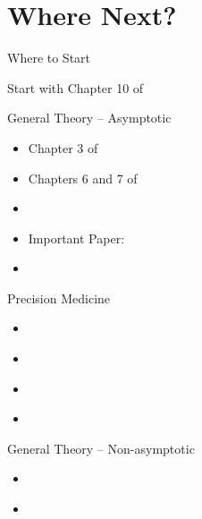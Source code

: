 \documentclass[aspectratio=169, professionalfonts]{beamer}
\begin{document}
\section{Where Next?}

\begin{frame}{Where to Start}
	\vfill

	Start with Chapter 10 of \cite{tsiatis2019Dynamic}
	\vfill

\end{frame}

\begin{frame}{General Theory -- Asymptotic}
	\vfill
	\begin{itemize}
		\item Chapter 3 of \cite{tsiatis2006Semiparametric}
		      \vfill
		\item Chapters 6 and 7 of \cite{vandervaart2000Asymptotic}
		      \vfill
		\item \cite{kosorok2008Introduction}
		      \vfill
		\item Important Paper: \cite{hirano2012Impossibility}
		      \vfill


		\item 	\cite{bibaut2021PostContextualBandit}
		      \vfill
	\end{itemize}
\end{frame}

\begin{frame}{Precision Medicine}
	\vfill
	\begin{itemize}
		\item \cite{laber2014Dynamic}
		      \vfill

		\item 	\cite{luedtke2016Statistical}
		      \vfill

		\item 	\cite{shi2022Statistical}

		\item \cite{hadad2021Confidence}
	\end{itemize}
	\vfill

\end{frame}

\begin{frame}{General Theory -- Non-asymptotic}
	\vfill
	\begin{itemize}
		\item \cite{waudby-smith2022Anytimevalid}
		      \vfill

		      \item\cite{howard2021Timeuniform}
	\end{itemize}
	\vfill


\end{frame}

\appendix
\printbibliography
\end{document}
